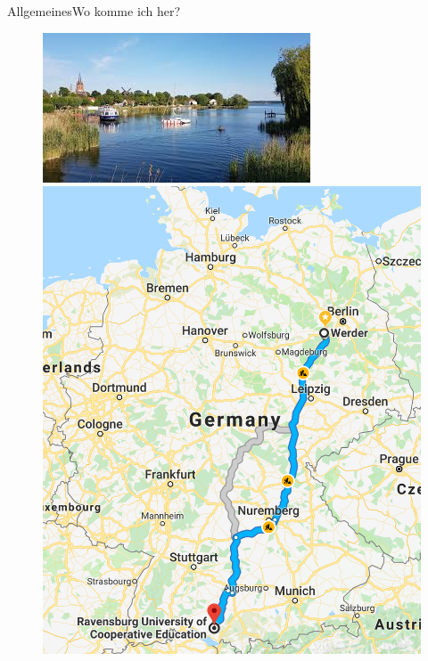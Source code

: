 	\begin{frame}{Allgemeines}{Wo komme ich her?}
		\begin{figure}
		\centering
			\begin{minipage}{0.7\textwidth}
			\centering
			\includegraphics[width=.95\linewidth]{graph/werder.jpg}
			\end{minipage}%
			\begin{minipage}{0.3\textwidth}
			\centering
			\includegraphics[width=.95\linewidth]{graph/route2werder.png}
			\end{minipage}
		\end{figure}
	\end{frame}

